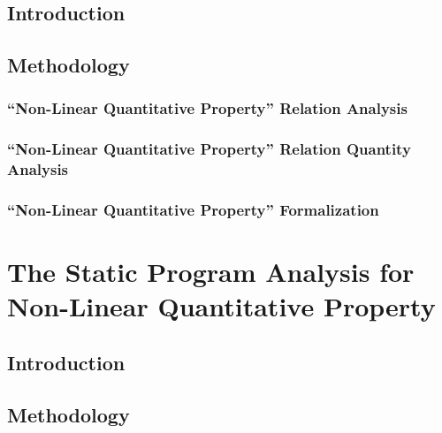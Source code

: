 \documentclass[a4paper,11pt]{article}
\begin{document}
\subsection{Introduction}
\label{subsec:dynamic-intro}


\subsection{Methodology}
\label{subsec:dynamic-methodology}

\subsubsection{``Non-Linear Quantitative Property'' Relation Analysis}
\label{subsubsec:dynamic-datadep}

\subsubsection{``Non-Linear Quantitative Property'' Relation Quantity  Analysis}
\label{subsubsec:dynamic-reachability}
%
\subsubsection{``Non-Linear Quantitative Property'' Formalization}
\label{subsubsec:dynamic-adapt}
%
%
% 

\section{The Static Program Analysis for Non-Linear Quantitative Property}
\label{sec:static}
\subsection{Introduction}
\label{subsec:dynamic-intro}
% 

\subsection{Methodology}
\label{subsec:dynamic-methodology}
\end{document}

